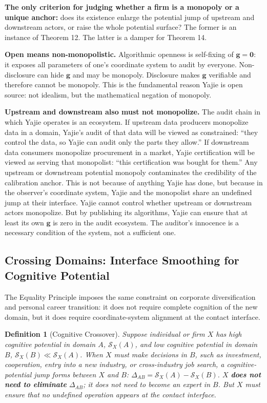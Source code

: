\documentclass[12pt,a4paper]{article}
\newtheorem{definition}[theorem]{Definition}
\theoremstyle{remark}
\begin{document}
\textbf{The only criterion for judging whether a firm is a monopoly or a unique anchor:} does its existence enlarge the potential jump of upstream and downstream actors, or raise the whole potential surface? The former is an instance of Theorem 12. The latter is a damper for Theorem 14.

\textbf{Open means non-monopolistic.} Algorithmic openness is self-fixing of $\mathbf{g} = \mathbf{0}$: it exposes all parameters of one's coordinate system to audit by everyone. Non-disclosure can hide $\mathbf{g}$ and may be monopoly. Disclosure makes $\mathbf{g}$ verifiable and therefore cannot be monopoly. This is the fundamental reason Yajie is open source: not idealism, but the mathematical negation of monopoly.

\textbf{Upstream and downstream also must not monopolize.} The audit chain in which Yajie operates is an ecosystem. If upstream data producers monopolize data in a domain, Yajie's audit of that data will be viewed as constrained: ``they control the data, so Yajie can audit only the parts they allow.'' If downstream data consumers monopolize procurement in a market, Yajie certification will be viewed as serving that monopolist: ``this certification was bought for them.'' Any upstream or downstream potential monopoly contaminates the credibility of the calibration anchor. This is not because of anything Yajie has done, but because in the observer's coordinate system, Yajie and the monopolist share an undefined jump at their interface. Yajie cannot control whether upstream or downstream actors monopolize. But by publishing its algorithms, Yajie can ensure that at least its own $\mathbf{g}$ is zero in the audit ecosystem. The auditor's innocence is a necessary condition of the system, not a sufficient one.

\subsection{Crossing Domains: Interface Smoothing for Cognitive Potential}

The Equality Principle imposes the same constraint on corporate diversification and personal career transition: it does not require complete cognition of the new domain, but it does require coordinate-system alignment at the contact interface.

\begin{definition}[Cognitive Crossover]\label{def:cognitive_crossover}
Suppose individual or firm $X$ has high cognitive potential in domain $A$, $\mathcal{S}_X(A)$, and low cognitive potential in domain $B$, $\mathcal{S}_X(B) \ll \mathcal{S}_X(A)$. When $X$ must make decisions in $B$, such as investment, cooperation, entry into a new industry, or cross-industry job search, a cognitive-potential jump forms between $X$ and $B$: $\Delta_{AB} = \mathcal{S}_X(A) - \mathcal{S}_X(B)$. $X$ \textbf{does not need to eliminate} $\Delta_{AB}$; it does not need to become an expert in $B$. But $X$ must ensure that no undefined operation appears at the contact interface.
\end{definition}
\end{document}
